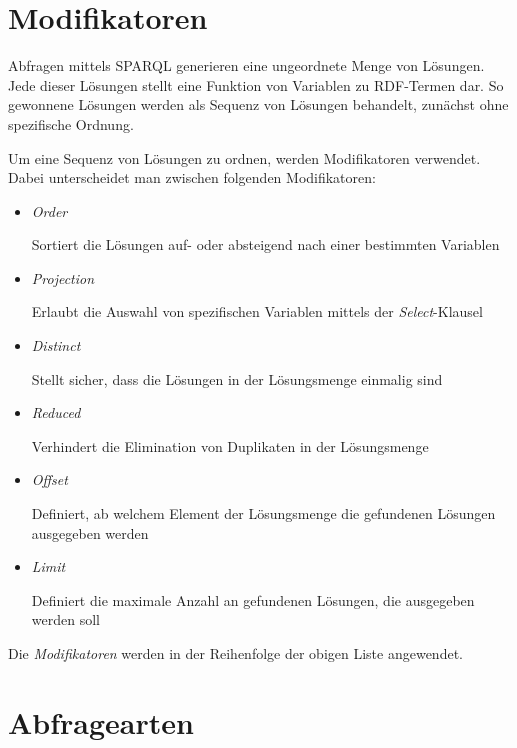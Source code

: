\section{Modifikatoren}
\label{sec:sparql_modifikatoren}
Abfragen mittels SPARQL generieren eine ungeordnete Menge von Lösungen. Jede dieser Lösungen stellt eine Funktion von Variablen zu RDF-Termen dar. So gewonnene Lösungen werden als Sequenz von Lösungen behandelt, zunächst ohne spezifische Ordnung.

Um eine Sequenz von Lösungen zu ordnen, werden Modifikatoren verwendet.\\
Dabei unterscheidet man zwischen folgenden Modifikatoren:

\begin{itemize}
    \item \textit{Order}

        Sortiert die Lösungen auf- oder absteigend nach einer bestimmten Variablen

    \item \textit{Projection}

        Erlaubt die Auswahl von spezifischen Variablen mittels der \textit{Select}-Klausel

    \item \textit{Distinct}

        Stellt sicher, dass die Lösungen in der Lösungsmenge einmalig sind

    \item \textit{Reduced}

        Verhindert die Elimination von Duplikaten in der Lösungsmenge

    \item \textit{Offset}

        Definiert, ab welchem Element der Lösungsmenge die gefundenen Lösungen ausgegeben werden

    \item \textit{Limit}

        Definiert die maximale Anzahl an gefundenen Lösungen, die ausgegeben werden soll

\end{itemize}

Die \textit{Modifikatoren} werden in der Reihenfolge der obigen Liste angewendet.


\section{Abfragearten}
\label{sec:sparql_abfragearten}

